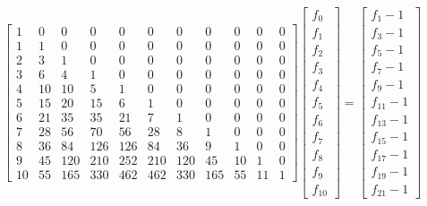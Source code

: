 \begin{displaymath}
    \left[\begin{array}{ccccccccccc}
        1 & 0 & 0 & 0 & 0 & 0 & 0 & 0 & 0 & 0 & 0\\
        1 & 1 & 0 & 0 & 0 & 0 & 0 & 0 & 0 & 0 & 0\\
        2 & 3 & 1 & 0 & 0 & 0 & 0 & 0 & 0 & 0 & 0\\
        3 & 6 & 4 & 1 & 0 & 0 & 0 & 0 & 0 & 0 & 0\\
        4 & 10 & 10 & 5 & 1 & 0 & 0 & 0 & 0 & 0 & 0\\
        5 & 15 & 20 & 15 & 6 & 1 & 0 & 0 & 0 & 0 & 0\\
        6 & 21 & 35 & 35 & 21 & 7 & 1 & 0 & 0 & 0 & 0\\
        7 & 28 & 56 & 70 & 56 & 28 & 8 & 1 & 0 & 0 & 0\\
        8 & 36 & 84 & 126 & 126 & 84 & 36 & 9 & 1 & 0 & 0\\
        9 & 45 & 120 & 210 & 252 & 210 & 120 & 45 & 10 & 1 & 0\\
        10 & 55 & 165 & 330 & 462 & 462 & 330 & 165 & 55 & 11 & 1
        \end{array}\right]\left[
        \begin{array}{c}
            f_{0}\\
            f_{1}\\
            f_{2}\\
            f_{3}\\
            f_{4}\\
            f_{5}\\
            f_{6}\\
            f_{7}\\
            f_{8}\\
            f_{9}\\
            f_{10}
        \end{array}\right]=\left[
        \begin{array}{c}
            f_{1} - 1\\
            f_{3} - 1\\
            f_{5} - 1\\
            f_{7} - 1\\
            f_{9} - 1\\
            f_{11} - 1\\
            f_{13} - 1\\
            f_{15} - 1\\
            f_{17} - 1\\
            f_{19} - 1\\
            f_{21} - 1
        \end{array}\right]
\end{displaymath}
